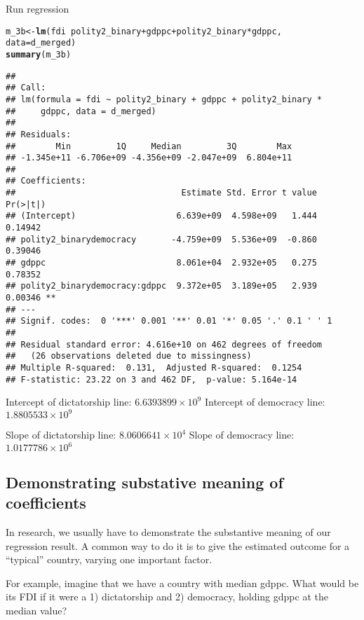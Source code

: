 \documentclass{article}\usepackage[]{graphicx}\usepackage[]{color}
\makeatletter
\newcommand{\hlopt}[1]{\textcolor[rgb]{0,0,0}{#1}}%
\newcommand{\hlstd}[1]{\textcolor[rgb]{0.345,0.345,0.345}{#1}}%
\newcommand{\hlkwb}[1]{\textcolor[rgb]{0.69,0.353,0.396}{#1}}%
\newcommand{\hlkwc}[1]{\textcolor[rgb]{0.333,0.667,0.333}{#1}}%
\newcommand{\hlkwd}[1]{\textcolor[rgb]{0.737,0.353,0.396}{\textbf{#1}}}%
\newenvironment{kframe}{%
 \def\at@end@of@kframe{}%
 \ifinner\ifhmode%
  \def\at@end@of@kframe{\end{minipage}}%
  \begin{minipage}{\columnwidth}%
 \fi\fi%
 \def\FrameCommand##1{\hskip\@totalleftmargin \hskip-\fboxsep
 \colorbox{shadecolor}{##1}\hskip-\fboxsep
     \hskip-\linewidth \hskip-\@totalleftmargin \hskip\columnwidth}%
 \MakeFramed {\advance\hsize-\width
   \@totalleftmargin\z@ \linewidth\hsize
   \@setminipage}}%
 {\par\unskip\endMakeFramed%
 \at@end@of@kframe}
\newenvironment{knitrout}{}{} %
\makeatother
\begin{document}
Run regression
\begin{knitrout}
\color{fgcolor}\begin{kframe}
\begin{alltt}
\hlstd{m_3b} \hlkwb{<-} \hlkwd{lm}\hlstd{(fdi} \hlopt{~} \hlstd{polity2_binary} \hlopt{+} \hlstd{gdppc} \hlopt{+} \hlstd{polity2_binary} \hlopt{*} \hlstd{gdppc,}
           \hlkwc{data} \hlstd{= d_merged)}
\hlkwd{summary}\hlstd{(m_3b)}
\end{alltt}
\begin{verbatim}
## 
## Call:
## lm(formula = fdi ~ polity2_binary + gdppc + polity2_binary * 
##     gdppc, data = d_merged)
## 
## Residuals:
##        Min         1Q     Median         3Q        Max 
## -1.345e+11 -6.706e+09 -4.356e+09 -2.047e+09  6.804e+11 
## 
## Coefficients:
##                                 Estimate Std. Error t value Pr(>|t|)   
## (Intercept)                    6.639e+09  4.598e+09   1.444  0.14942   
## polity2_binarydemocracy       -4.759e+09  5.536e+09  -0.860  0.39046   
## gdppc                          8.061e+04  2.932e+05   0.275  0.78352   
## polity2_binarydemocracy:gdppc  9.372e+05  3.189e+05   2.939  0.00346 **
## ---
## Signif. codes:  0 '***' 0.001 '**' 0.01 '*' 0.05 '.' 0.1 ' ' 1
## 
## Residual standard error: 4.616e+10 on 462 degrees of freedom
##   (26 observations deleted due to missingness)
## Multiple R-squared:  0.131,	Adjusted R-squared:  0.1254 
## F-statistic: 23.22 on 3 and 462 DF,  p-value: 5.164e-14
\end{verbatim}
\end{kframe}
\end{knitrout}

Intercept of dictatorship line: \ensuremath{6.6393899\times 10^{9}}
Intercept of democracy line: \ensuremath{1.8805533\times 10^{9}}

Slope of dictatorship line: \ensuremath{8.0606641\times 10^{4}}
Slope of democracy line: \ensuremath{1.0177786\times 10^{6}}

\subsection{Demonstrating substative meaning of coefficients}

In research, we usually have to demonstrate the substantive meaning of our regression result. A common way to do it is to give the estimated outcome for a ``typical'' country, varying one important factor.

For example, imagine that we have a country with median gdppc. What would be its FDI if it were a 1) dictatorship and 2) democracy, holding gdppc at the median value?
\end{document}
